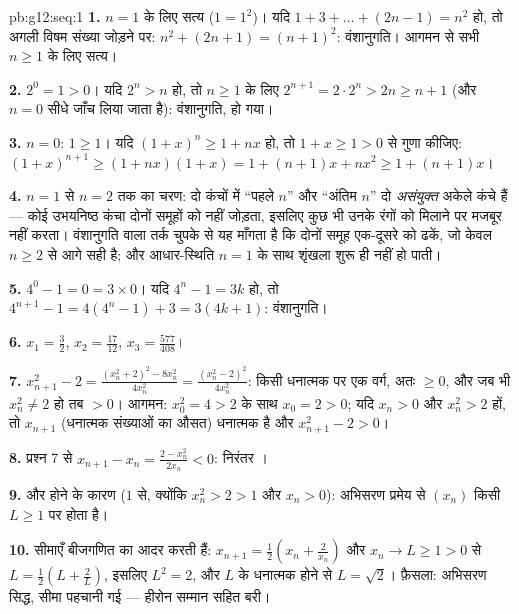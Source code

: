 \begin{solution}{pb:g12:seq:1}
\textbf{1.} $n = 1$ के लिए सत्य ($1 = 1^2$)। यदि $1 + 3 + \dots + (2n - 1) = n^2$ हो, तो अगली विषम संख्या
जोड़ने पर: $n^2 + (2n + 1) = (n + 1)^2$: वंशानुगति। आगमन से सभी $n \geq 1$ के लिए सत्य।

\textbf{2.} $2^0 = 1 > 0$। यदि $2^n > n$ हो, तो $n \geq 1$ के लिए $2^{n+1} = 2 \cdot 2^n > 2n \geq n + 1$ (और $n = 0$ सीधे जाँच
लिया जाता है): वंशानुगति, हो गया।

\textbf{3.} $n = 0$: $1 \geq 1$। यदि $(1 + x)^n \geq 1 + nx$ हो, तो $1 + x \geq 1 > 0$ से गुणा कीजिए: $(1 + x)^{n+1} \geq (1 + nx)(1 + x) = 1 + (n + 1)x + nx^2
\geq 1 + (n + 1)x$।

\textbf{4.} $n = 1$ से $n = 2$ तक का चरण: दो कंचों में ``पहले $n$'' और
``अंतिम $n$'' दो \emph{असंयुक्त} अकेले कंचे हैं --- कोई उभयनिष्ठ कंचा दोनों
समूहों को नहीं जोड़ता, इसलिए कुछ भी उनके रंगों को मिलाने पर मजबूर नहीं करता।
वंशानुगति वाला तर्क चुपके से यह माँगता है कि दोनों समूह एक-दूसरे को ढकें, जो
केवल $n \geq 2$ से आगे सही है; और आधार-स्थिति $n = 1$ के साथ शृंखला शुरू ही नहीं
हो पाती।

\textbf{5.} $4^0 - 1 = 0 = 3 \times 0$। यदि $4^n - 1 = 3k$ हो, तो $4^{n+1} - 1 = 4(4^n - 1) + 3 = 3(4k + 1)$: वंशानुगति।

\textbf{6.} $x_1 = \frac32$, $x_2 = \frac{17}{12}$, $x_3 = \frac{577}{408}$।

\textbf{7.} $x_{n+1}^2 - 2 = \frac{(x_n^2 + 2)^2 - 8x_n^2}
{4x_n^2} = \frac{(x_n^2 - 2)^2}{4 x_n^2}$: किसी धनात्मक पर एक वर्ग, अतः $\geq 0$, और जब भी $x_n^2 \neq 2$ हो तब
$> 0$। आगमन: $x_0^2 = 4 > 2$ के साथ $x_0 = 2 > 0$; यदि $x_n > 0$ और $x_n^2 > 2$ हों, तो $x_{n+1}$
(धनात्मक संख्याओं का औसत) धनात्मक है और $x_{n+1}^2 - 2 > 0$।

\textbf{8.} प्रश्न 7 से $x_{n+1} - x_n = \frac{2 - x_n^2}{2x_n} < 0$: निरंतर ।

\textbf{9.}  और  होने के कारण ($1$ से, क्योंकि $x_n^2 > 2 > 1$
और $x_n > 0$):  अभिसरण प्रमेय से $(x_n)$ किसी $L \geq 1$ पर  होता है।

\textbf{10.} सीमाएँ बीजगणित का आदर करती हैं: $x_{n+1} = \frac12\left(x_n + \frac{2}{x_n}\right)$ और $x_n \to L \geq 1 > 0$ से $L = \frac12\left(L + \frac2L\right)$, इसलिए
$L^2 = 2$, और $L$ के धनात्मक होने से $L = \sqrt2$। फ़ैसला: अभिसरण सिद्ध, सीमा पहचानी
गई --- हीरोन सम्मान सहित बरी।


\end{solution}
